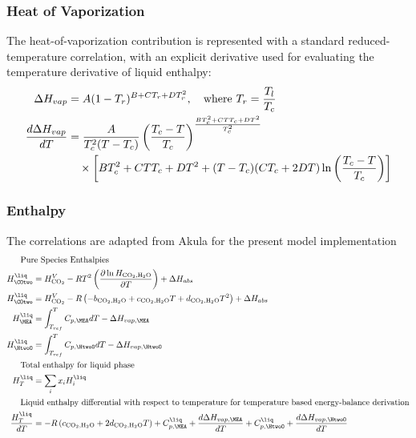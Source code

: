             \subsubsection{Heat of Vaporization}
                The heat-of-vaporization contribution is represented with a standard reduced-temperature correlation, with an explicit derivative used for evaluating the temperature derivative of liquid enthalpy:
                \begin{align}
                    \Delta H_{vap} &= A (1 - T_r)^{B + C T_r + D T_r^2}, \quad \text{where } T_r = \frac{T_l}{T_c} \\
                    \frac{d\Delta H_{vap}}{dT}
                    &= \frac{A}{T_c^2(T - T_c)}
                    \left( \frac{T_c - T}{T_c} \right)^{\frac{BT_c^2 + CTT_c + DT^2}{T_c^2}} \notag\\
                    &\quad\times \left[ BT_c^2 + CTT_c + DT^2
                    + (T - T_c)(CT_c + 2DT) \ln\left( \frac{T_c - T}{T_c} \right) \right]
                \end{align}

            \subsubsection{Enthalpy}
                The correlations are adapted from Akula \cite{Akula2023} for the present model implementation
                \begin{align}
                    \shortintertext{\quad\; Pure Species Enthalpies}
                    H^{\liq}_{\COtwo} &= H_{\text{CO}_2}^V - RT^2 \left( \frac{\partial \ln H_{\text{CO}_2, \text{H}_2\text{O}}}{\partial T} \right) + \Delta H_{abs} \\
                    H^{\liq}_{\COtwo} &= H_{\text{CO}_2}^V - R \left( -b_{\text{CO}_2, \text{H}_2\text{O}} + c_{\text{CO}_2, \text{H}_2\text{O}} T + d_{\text{CO}_2, \text{H}_2\text{O}} T^2 \right) + \Delta H_{abs} \\
                    H^{\liq}_{\MEA} &= \int_{T_{ref}}^{T} C_{p,\MEA} dT - \Delta H_{vap, \MEA} \\
                    H^{\liq}_{\HtwoO} &= \int_{T_{ref}}^{T} C_{p,\HtwoO} dT - \Delta H_{vap, \HtwoO} \\
                    \shortintertext{\quad\; Total enthalpy for liquid phase}
                    H^{\liq}_{T} &= \sum_{i} x_iH^{\liq}_{i} \\
                    \shortintertext{\quad\; Liquid enthalpy differential with respect to temperature for temperature based energy-balance derivation}
                    \frac{H^{\liq}_{T}}{dT} &= -R\left(c_{\text{CO}_2, \text{H}_2\text{O}}  + 2d_{\text{CO}_2, \text{H}_2\text{O}} T \right) + C^{\liq}_{p, \MEA} + \frac{d\Delta H_{vap, \MEA}}{dT} +  C^{\liq}_{p, \HtwoO}+ \frac{d\Delta H_{vap, \HtwoO}}{dT}
                \end{align}

